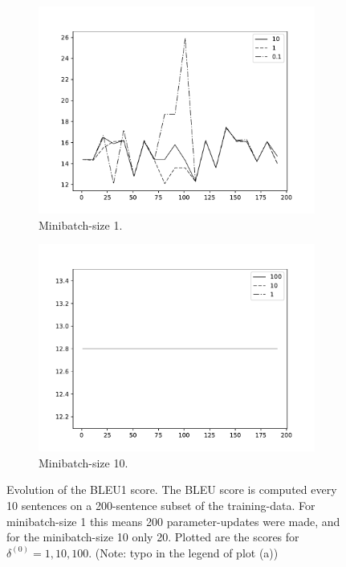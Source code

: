 \documentclass[11pt,a4paper]{article}
\begin{document}
\begin{figure}
\begin{subfigure}{\linewidth}
    \includegraphics[width=\linewidth]{images/bleu1-mb1.pdf}
    \caption{Minibatch-size 1.}
    \label{fig:bleu1-mb1}
\end{subfigure}
\begin{subfigure}{\linewidth}
    \includegraphics[width=\linewidth]{images/bleu1-mb10.pdf}
    \caption{Minibatch-size 10.}
    \label{fig:bleu1-mb10}
\end{subfigure}
\caption{Evolution of the BLEU1 score. The BLEU score is computed every 10 sentences on a 200-sentence subset of the training-data. For minibatch-size 1 this means 200 parameter-updates were made, and for the minibatch-size 10 only 20. Plotted are the scores for $\delta^{(0)} = 1, 10, 100$. (Note: typo in the legend of plot (a))}
\label{fig:bleu1}
\end{figure}
\end{document}
